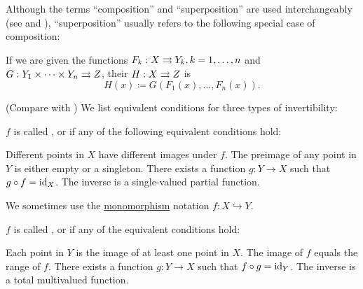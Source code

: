 \begin{definition}
\begin{defenum}[resume=def:function]
     Although the terms \enquote{composition} and \enquote{superposition} are used interchangeably (see \cite[44]{Enderton1977} and \cite[]{Фихтенгольц1968/1}), \enquote{superposition} usually refers to the following special case of composition:

    If we are given the functions \( F_k: X \rightrightarrows Y_k, k = 1, \ldots, n \) and \( G: Y_1 \times \cdots \times Y_n \rightrightarrows Z \), their  \( H: X \rightrightarrows Z \) is
    \begin{equation*}
      H(x) \coloneqq G(F_1(x), \ldots, F_n(x)).
    \end{equation*}
  \end{defenum}
\end{definition}

\begin{definition}\label{def:function_invertibility}(Compare with )
  We list equivalent conditions for three types of invertibility:
  \begin{defenum}
     \( f \) is called ,  or  if any of the following equivalent conditions hold:
    \begin{defenum}
       Different points in \( X \) have different images under \( f \).
       The preimage of any point in \( Y \) is either empty or a singleton.
       There exists a function \( g: Y \to X \) such that \( g \circ f = \operatorname{id}_X \).
       The inverse is a single-valued partial function.
    \end{defenum}

    We sometimes use the \hyperref[def:morphism_invertibility/monomorphism]{monomorphism} notation \( f: X \hookrightarrow Y \).

     \( f \) is called ,  or  if any of the equivalent conditions hold:
    \begin{defenum}
       Each point in \( Y \) is the image of at least one point in \( X \).
       The image of \( f \) equals the range of \( f \).
       There exists a function \( g: Y \to X \) such that \( f \circ g = \operatorname{id}_Y \).
       The inverse is a total multivalued function.
    \end{defenum}


\end{defenum}
\end{definition}
